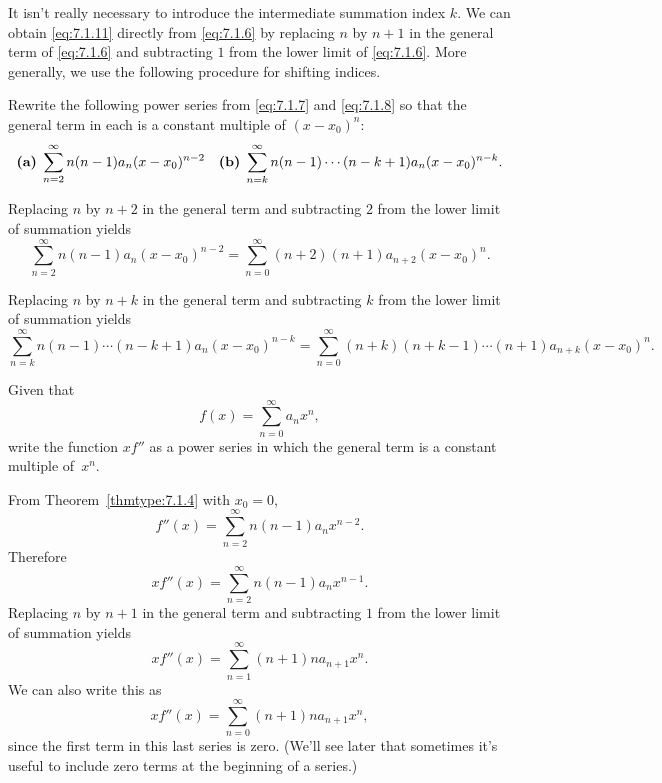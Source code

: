 It isn't really necessary to introduce the intermediate summation index $k$. We can obtain
\eqref{eq:7.1.11} directly from \eqref{eq:7.1.6} by replacing $n$ by $n+1$ in the general term of
\eqref{eq:7.1.6} and subtracting $1$ from the lower limit of \eqref{eq:7.1.6}. More generally, we
use the following procedure for shifting indices.


\begin{example}
  \label{example:7.1.3} \rm Rewrite the following power series from \eqref{eq:7.1.7} and
  \eqref{eq:7.1.8} so that the general term in each is a constant multiple of $(x-x_{0})^{n}$:
  \[
    \mbox{\bf (a)}\; \sum_{n=2}^{\infty}n(n-1)a_{n}(x-x_{0})^{n-2}\quad\mbox{\bf (b)}\; \sum_{n=k}^{\infty}n(n-1)\cdots(n-k+1)a_{n}(x-x_{0})^{n-k}.
  \]
\end{example}

\begin{examplesolution}
 Replacing $n$ by $n+2$ in the general term and subtracting $2$ from the lower limit
of summation yields
\[
  \sum_{n=2}^{\infty}n(n-1)a_{n}(x-x_{0})^{n-2}= \sum_{n=0}^{\infty}(n+2)(n+1)a_{n+2}(x-x_{0})^{n}.
\]

 Replacing $n$ by $n+k$ in the general term and subtracting $k$ from the lower limit
of summation yields
\[
  \sum_{n=k}^{\infty}n(n-1)\cdots(n-k+1)a_{n}(x-x_{0})^{n-k}= \sum_{n=0}^{\infty}(n+k)(n+k-1)\cdots(n+1)a_{n+k}(x-x_{0})^{n}.
\]
\end{examplesolution}

\begin{example}
  \label{example:7.1.4} \rm Given that
  \[
    f(x)=\sum_{n=0}^{\infty}a_{n}x^{n},
  \]
  write the function $xf''$ as a power series in which the general term is a constant multiple
  of~$x^{n}$.
\end{example}

\begin{examplesolution}
\solution From Theorem~\ref{thmtype:7.1.4} with $x_{0}=0$,
\[
  f''(x)=\sum_{n=2}^{\infty}n(n-1)a_{n}x^{n-2}.
\]
Therefore
\[
  xf''(x)=\sum_{n=2}^{\infty}n(n-1)a_{n}x^{n-1}.
\]
Replacing $n$ by $n+1$ in the general term and subtracting $1$ from the lower limit of summation
yields
\[
  xf''(x)=\sum_{n=1}^{\infty}(n+1)na_{n+1}x^{n}.
\]
We can also write this as
\[
  xf''(x)=\sum_{n=0}^{\infty}(n+1)na_{n+1}x^{n},
\]
since the first term in this last series is zero. (We'll see later that sometimes it's useful to
include zero terms at the beginning of a series.)
\end{examplesolution}

